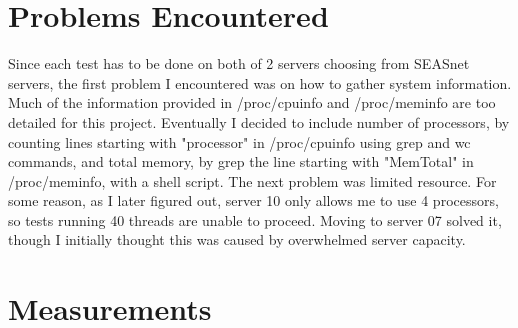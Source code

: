 \documentclass[letterpaper,twocolumn,10pt]{article}
\begin{document}
\section{Problems Encountered}

Since each test has to be done on both of 2 servers choosing from SEASnet servers, the first problem I encountered was on how to gather system information.
Much of the information provided in /proc/cpuinfo and /proc/meminfo are too detailed for this project. 
Eventually I decided to include number of processors, by counting lines starting with "processor" in /proc/cpuinfo using grep and wc commands, 
and total memory, by grep the line starting with "MemTotal" in /proc/meminfo, with a shell script.
The next problem was limited resource. For some reason, as I later figured out, server 10 only allows me to use 4 processors, so tests running 40 threads are unable to proceed.
Moving to server 07 solved it, though I initially thought this was caused by overwhelmed server capacity.

\section{Measurements}
\end{document}
